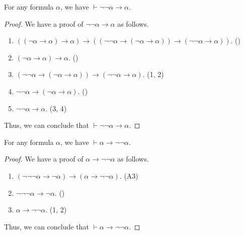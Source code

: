\begin{theorem}
  \label{thm:dn-elim}
  For any formula $\alpha$, we have $\vdash \neg\neg\alpha \to \alpha$.
\end{theorem}
\begin{proof}
  We have a proof of $\neg\neg\alpha \to \alpha$ as follows.
  \begin{enumerate}[(1)]
    \item $((\neg\alpha \to \alpha) \to \alpha) \to ((\neg\neg\alpha \to
    (\neg\alpha \to \alpha)) \to (\neg\neg\alpha \to \alpha))$.
    \hfill ()
    \item $(\neg\alpha \to \alpha) \to \alpha$. \hfill ()
    \item $(\neg\neg\alpha \to (\neg\alpha \to \alpha)) \to (\neg\neg\alpha \to
    \alpha)$. \hfill (1, 2)
    \item $\neg\neg\alpha \to (\neg\alpha \to \alpha)$.
    \hfill ()
    \item $\neg\neg\alpha \to \alpha$. \hfill (3, 4)
  \end{enumerate}
  Thus, we can conclude that $\vdash \neg\neg\alpha \to \alpha$.
\end{proof}

\begin{theorem}
  \label{thm:dn-intro}
  For any formula $\alpha$, we have $\vdash \alpha \to \neg\neg\alpha$.
\end{theorem}
\begin{proof}
  We have a proof of $\alpha \to \neg\neg\alpha$ as follows.
  \begin{enumerate}[(1)]
    \item $(\neg\neg\neg\alpha \to \neg\alpha) \to (\alpha \to
    \neg\neg\alpha)$. \hfill (A3)
    \item $\neg\neg\neg\alpha \to \neg\alpha$. \hfill ()
    \item $\alpha \to \neg\neg\alpha$. \hfill (1, 2)
  \end{enumerate}
  Thus, we can conclude that $\vdash \alpha \to \neg\neg\alpha$.
\end{proof}

